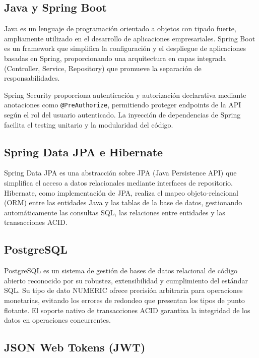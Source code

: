 \documentclass[12pt, letterpaper]{report}
\begin{document}
\subsection{Java y Spring Boot}

Java es un lenguaje de programación orientado a objetos con tipado fuerte, ampliamente utilizado en el desarrollo de aplicaciones empresariales. Spring Boot es un framework que simplifica la configuración y el despliegue de aplicaciones basadas en Spring, proporcionando una arquitectura en capas integrada (Controller, Service, Repository) que promueve la separación de responsabilidades.

Spring Security proporciona autenticación y autorización declarativa mediante anotaciones como \texttt{@PreAuthorize}, permitiendo proteger endpoints de la API según el rol del usuario autenticado. La inyección de dependencias de Spring facilita el testing unitario y la modularidad del código.

\subsection{Spring Data JPA e Hibernate}

Spring Data JPA es una abstracción sobre JPA (Java Persistence API) que simplifica el acceso a datos relacionales mediante interfaces de repositorio. Hibernate, como implementación de JPA, realiza el mapeo objeto-relacional (ORM) entre las entidades Java y las tablas de la base de datos, gestionando automáticamente las consultas SQL, las relaciones entre entidades y las transacciones ACID.

\subsection{PostgreSQL}

PostgreSQL es un sistema de gestión de bases de datos relacional de código abierto reconocido por su robustez, extensibilidad y cumplimiento del estándar SQL. Su tipo de dato NUMERIC ofrece precisión arbitraria para operaciones monetarias, evitando los errores de redondeo que presentan los tipos de punto flotante. El soporte nativo de transacciones ACID garantiza la integridad de los datos en operaciones concurrentes.

\subsection{JSON Web Tokens (JWT)}
\end{document}
